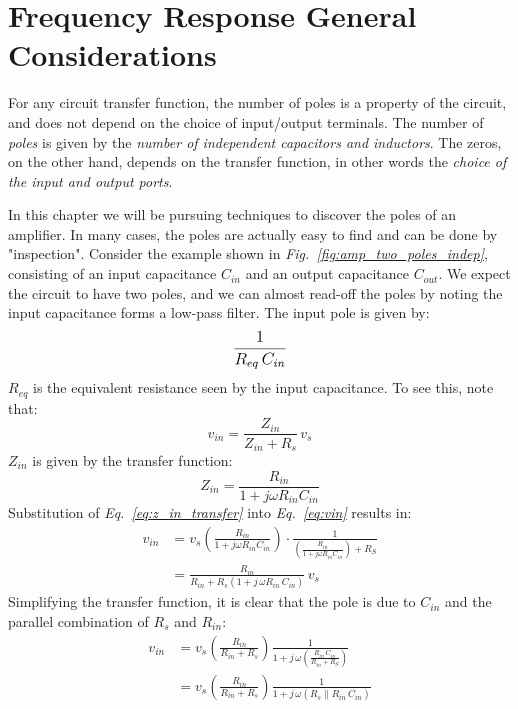 \section{Frequency Response General Considerations}
For any circuit transfer function, the number of poles is a property of the circuit, and does not depend on the choice of input/output terminals.  The number of \textit{poles} is given by the \textit{number of independent capacitors and inductors}.  The zeros, on the other hand, depends on the transfer function, in other words the \textit{choice of the input and output ports}.

In this chapter we will be pursuing techniques to discover the poles of an amplifier.  In many cases, the poles are actually easy to find and can be done by "inspection".  Consider the example shown in \emph{Fig.~\ref{fig:amp_two_poles_indep}}, consisting of an input capacitance $C_{in}$ and an output capacitance $C_{out}$.  We expect the circuit to have two poles, and we can almost read-off the poles by noting the input capacitance forms a low-pass filter.  The input pole is given by:
    \[
        \mathlarger{\frac{1}{R_{eq}\,C_{in}}}
    \]
$R_{eq}$ is the equivalent resistance seen by the input capacitance.  To see this, note that:
    \begin{equation}
        v_{in} = \frac{Z_{in}}{Z_{in} + R_s}\,v_s
        \label{eq:vin}
    \end{equation} 
$Z_{in}$ is given by the transfer function:
    \begin{equation}
        Z_{in} = \frac{R_{in}}{1 + j\omega R_{in} C_{in}}
        \label {eq:z_in_transfer}
    \end{equation}
Substitution of \emph{Eq.~\ref{eq:z_in_transfer}} into \emph{Eq.~\ref{eq:vin}} results in:
    \begin{align}
        v_{in} &= v_s\left(\frac{R_{in}}{1 + j\omega R_{in} C_{in}}\right)
                    \cdot \frac{1}{\left(\frac{R_{in}}{1 + j\omega R_{in} C_{in}}\right) + R_S}\\[0.25cm]
        &= \frac{R_{in}}{R_{in} + R_s(1 + j\,\omega R_{in}\,C_{in})}\,v_s
    \end{align}
Simplifying the transfer function, it is clear that the pole is due to $C_{in}$ and the parallel combination of $R_s $ and $R_{in}$:
    \begin{align}
        v_{in} &= v_s \left(\frac{R_{in}}{R_{in} + R_s}\right) \frac{1}{1 + j\,\omega\left(\frac{R_{in}\,C_{in}}{R_{in} + R_S}\right)}\\[0.25cm]
        &= v_s \left(\frac{R_{in}}{R_{in} + R_s}\right) \frac{1}{1 + j\,\omega(R_s \parallel R_{in}\,C_{in})}
    \end{align}
